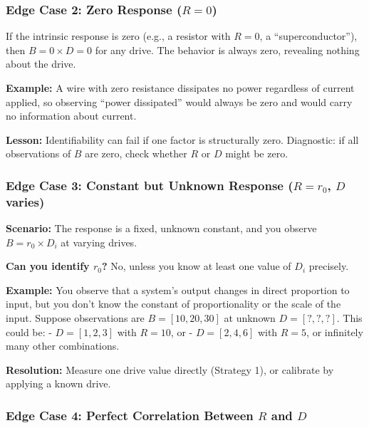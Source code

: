 \documentclass[
]{article}
\begin{document}
\subsubsection{\texorpdfstring{Edge Case 2: Zero Response
(\(R = 0\))}{Edge Case 2: Zero Response (R = 0)}}\label{edge-case-2-zero-response-r-0}

If the intrinsic response is zero (e.g., a resistor with \(R = 0\), a
``superconductor''), then \(B = 0 \times D = 0\) for any drive. The
behavior is always zero, revealing nothing about the drive.

\textbf{Example:} A wire with zero resistance dissipates no power
regardless of current applied, so observing ``power dissipated'' would
always be zero and would carry no information about current.

\textbf{Lesson:} Identifiability can fail if one factor is structurally
zero. Diagnostic: if all observations of \(B\) are zero, check whether
\(R\) or \(D\) might be zero.

\subsubsection{\texorpdfstring{Edge Case 3: Constant but Unknown
Response (\(R = r_0\), \(D\)
varies)}{Edge Case 3: Constant but Unknown Response (R = r\_0, D varies)}}\label{edge-case-3-constant-but-unknown-response-r-r_0-d-varies}

\textbf{Scenario:} The response is a fixed, unknown constant, and you
observe \(B = r_0 \times D_i\) at varying drives.

\textbf{Can you identify \(r_0\)?} No, unless you know at least one
value of \(D_i\) precisely.

\textbf{Example:} You observe that a system's output changes in direct
proportion to input, but you don't know the constant of proportionality
or the scale of the input. Suppose observations are \(B = [10, 20, 30]\)
at unknown \(D = [?, ?, ?]\). This could be: - \(D = [1, 2, 3]\) with
\(R = 10\), or - \(D = [2, 4, 6]\) with \(R = 5\), or infinitely many
other combinations.

\textbf{Resolution:} Measure one drive value directly (Strategy 1), or
calibrate by applying a known drive.

\subsubsection{\texorpdfstring{Edge Case 4: Perfect Correlation Between
\(R\) and
\(D\)}{Edge Case 4: Perfect Correlation Between R and D}}\label{edge-case-4-perfect-correlation-between-r-and-d}
\end{document}
